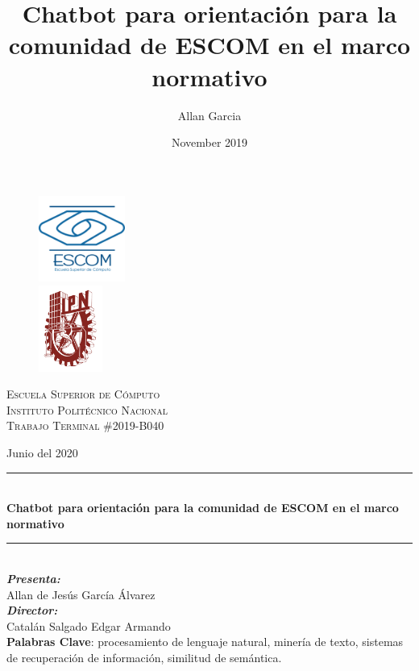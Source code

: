 \documentclass{book}
\title{Chatbot para orientación para la comunidad de ESCOM en el marco normativo}
\author{Allan Garcia}
\date{November 2019}
\newcommand{\HRule}{\rule{\linewidth}{0.5mm}} %
\begin{document}
%
%
\begin{titlepage}
		\centering
		\begin{figure}
			\begin{minipage}[t]{0.4\textwidth}
    			\includegraphics[height=80pt]{images/escom}
  			\end{minipage}
  			\hfill
			\begin{minipage}[t]{0.4\textwidth}
				\begin{flushright}
	    			\includegraphics[height=80pt]{images/ipn}				
				\end{flushright}
  			\end{minipage}
		\end{figure}
		
		
		\textsc{\LARGE Escuela Superior de Cómputo}\\[.2cm]
		\textsc{\LARGE Instituto Politécnico Nacional}\\[1.4cm]
		
		\textsc{\Large Trabajo Terminal \#2019-B040}
		
		Junio del 2020
		
		\HRule \\[0.9cm]
			{ \LARGE \bfseries Chatbot para orientación para la comunidad de ESCOM en el marco normativo}\\[0.7cm]
		\HRule \\[1cm]
		
		\textbf{\Large \emph{Presenta:}}\\[.2cm]
		
		{\large Allan de Jesús García \'{A}lvarez}\\[.8cm]
		
		\textbf{\Large \emph{Director:}}\\[.2cm]
		
		{\large Catalán Salgado Edgar Armando}\\[.8cm]
		
		\textbf{\large Palabras Clave}: procesamiento de lenguaje natural, minería de texto, sistemas de recuperación de información, similitud de semántica.
\end{titlepage}

\tableofcontents











\printbibliography
\end{document}
